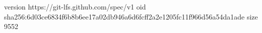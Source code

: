version https://git-lfs.github.com/spec/v1
oid sha256:6d03ce6834f6b8b6ee17a02db946a6d6fcff2a2e1205fc11f966d56a54da1ade
size 9552

